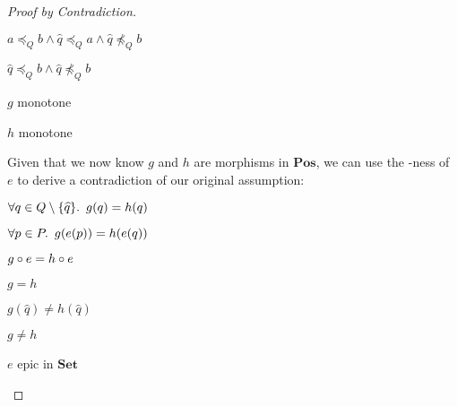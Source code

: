 \begin{lemma}
\begin{proof}[Proof by Contradiction]
\begin{itemize}
\begin{itemize}
          \step[\imps]
            $a\preceq_Qb\wedge \widehat{q}\preceq_Qa\wedge \widehat{q}\npreceq_Qb$

          \step[\imps]
            $\widehat{q}\preceq_Qb\wedge \widehat{q}\npreceq_Qb$
        \end{itemize}

      \step[\contras] $g$ monotone
        \marginnote{\Contra}

      \step $h$ monotone

      \addtolength{\itemsep}{.5\baselineskip}
      \step Given that we now know $g$ and $h$ are morphisms in $\mathbf{Pos}$, we can use the \Epic-ness of $e$ to derive a contradiction of our original assumption:

      \step
        \begin{itemize}
          \subp{\dagger}
            $\forall q\in Q\setminus\{\widehat{q}\}\ldotp~g(q) = h(q)$

          \step[\imps]
            $\forall p\in P\ldotp~g(e(p)) = h(e(q))$


          \step[\iffs]
            $g\circ e = h\circ e$
            \marginnote{\Def-$=$}

          \step[\imps]
            $g = h$
        \end{itemize}
      \addtolength{\itemsep}{-.5\baselineskip}

      \step
        \begin{itemize}
          \subp{\ddagger}
            $g(\widehat{q})\neq h(\widehat{q})$

          \step[\imps]
            $g\neq h$
            \marginnote{\Def-$\neq$}
        \end{itemize}

        \step[\contras] $e$ epic in $\mathbf{Set}$
          \qedhere
          \marginnote{\Contra-$\dagger$}
    \end{itemize}
  \end{proof}
\end{lemma}

